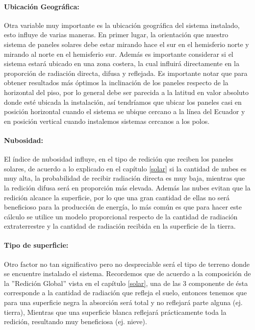\paragraph{Ubicación Geográfica:}
Otra variable muy importante es la ubicación geográfica del sistema instalado, esto influye de varias maneras. En primer lugar, la orientación que nuestro sistema de paneles solares debe estar mirando hace el sur en el hemisferio norte y mirando al norte en el hemisferio sur. Además es importante considerar si el sistema estará ubicado en una zona costera, la cual influirá directamente en la proporción de radiación directa, difusa y reflejada. Es importante notar que para obtener resultados más óptimos la inclinación de los paneles respecto de la horizontal del piso, por lo general debe ser parecida a la latitud en valor absoluto donde esté ubicada la instalación, así tendríamos que ubicar los paneles casi en posición horizontal cuando el sistema se ubique cercano a la línea del Ecuador y en posición vertical cuando instalemos sistemas cercanos a los polos.

\paragraph{Nubosidad:}
El índice de nubosidad influye, en el tipo de redición que reciben los paneles solares, de acuerdo a lo explicado en el capítulo \ref{solar} si la cantidad de nubes es muy alta, la probabilidad de recibir radiación directa es muy baja, mientras que la redición difusa será en proporción más elevada. Además las nubes evitan que la redición alcance la superficie, por lo que una gran cantidad de ellas no será beneficioso para la producción de energía, lo más común es que para hacer este cálculo se utilice un modelo proporcional respecto de la cantidad de radiación extraterrestre y la cantidad de radiación recibida en la superficie de la tierra.

\paragraph{Tipo de superficie:}
Otro factor no tan significativo pero no despreciable será el tipo de terreno donde se encuentre instalado el sistema. Recordemos que de acuerdo a la composición de la ''Redición Global'' vista en el capítulo \ref{solar}, una de las 3 componente de ésta corresponde a la cantidad de radiación que refleja el suelo, entonces tenemos que para una superficie negra la absorción será total y no reflejará parte alguna (ej. tierra), Mientras que una superficie blanca reflejará prácticamente toda la redición, resultando muy beneficiosa (ej. nieve).\\

